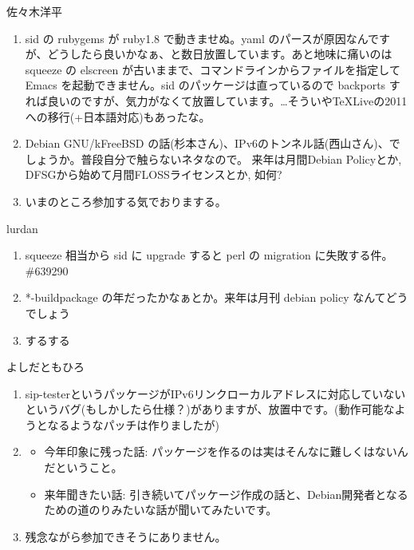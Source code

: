 \documentclass[mingoth,a4paper]{jsarticle}
\begin{document}
\begin{prework}{ 佐々木洋平 }
  \begin{enumerate}
  \item sid の rubygems が ruby1.8 で動きませぬ。yaml のパースが原因なんですが、どうしたら良いかなぁ、と数日放置しています。あと地味に痛いのは squeeze の elscreen が古いままで、コマンドラインからファイルを指定して Emacs を起動できません。sid のパッケージは直っているので backports すれば良いのですが、気力がなくて放置しています。…そういや\TeX Liveの2011への移行(+日本語対応)もあったな。
  \item Debian GNU/kFreeBSD の話(杉本さん)、IPv6のトンネル話(西山さん)、でしょうか。普段自分で触らないネタなので。
    来年は月間Debian Policyとか, DFSGから始めて月間FLOSSライセンスとか, 如何?
  \item いまのところ参加する気でおりまする。
  \end{enumerate}
\end{prework}

\begin{prework}{ lurdan }
  \begin{enumerate}
  \item squeeze 相当から sid に upgrade すると perl の migration に失敗する件。\#639290
  \item *-buildpackage の年だったかなぁとか。来年は月刊 debian policy なんてどうでしょう
  \item するする
  \end{enumerate}
\end{prework}

\begin{prework}{ よしだともひろ }
  \begin{enumerate}
  \item sip-testerというパッケージがIPv6リンクローカルアドレスに対応していないというバグ(もしかしたら仕様？)がありますが、放置中です。(動作可能なようとなるようなパッチは作りましたが)
  \item
    \begin{itemize}
    \item 今年印象に残った話: パッケージを作るのは実はそんなに難しくはないんだということ。
    \item 来年聞きたい話: 引き続いてパッケージ作成の話と、Debian開発者となるための道のりみたいな話が聞いてみたいです。
    \end{itemize}
  \item 残念ながら参加できそうにありません。
  \end{enumerate}
\end{prework}
\end{document}
